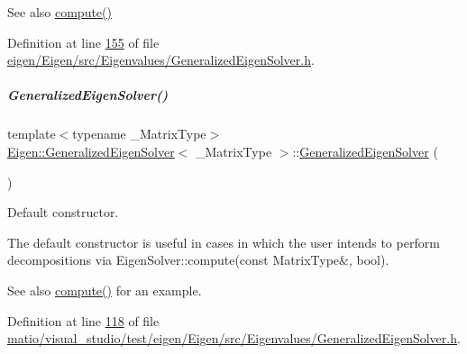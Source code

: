 \begin{DoxySeeAlso}{See also}
\hyperlink{group___eigenvalues___module_a275910b47dfe5f40211dcb59cfd68f3c}{compute()} 
\end{DoxySeeAlso}


Definition at line \hyperlink{eigen_2_eigen_2src_2_eigenvalues_2_generalized_eigen_solver_8h_source_l00155}{155} of file \hyperlink{eigen_2_eigen_2src_2_eigenvalues_2_generalized_eigen_solver_8h_source}{eigen/\+Eigen/src/\+Eigenvalues/\+Generalized\+Eigen\+Solver.\+h}.

\mbox{\label{group___eigenvalues___module_ae745f39da43f9df192cc2875d82b4cf1}} 
\subparagraph{\texorpdfstring{Generalized\+Eigen\+Solver()}{GeneralizedEigenSolver()}\hspace{0.1cm}{\footnotesize\ttfamily [4/6]}}
{\footnotesize\ttfamily template$<$typename \+\_\+\+Matrix\+Type$>$ \\
\hyperlink{group___eigenvalues___module_class_eigen_1_1_generalized_eigen_solver}{Eigen\+::\+Generalized\+Eigen\+Solver}$<$ \+\_\+\+Matrix\+Type $>$\+::\hyperlink{group___eigenvalues___module_class_eigen_1_1_generalized_eigen_solver}{Generalized\+Eigen\+Solver} (\begin{DoxyParamCaption}{ }\end{DoxyParamCaption})\hspace{0.3cm}{\ttfamily [inline]}}



Default constructor. 

The default constructor is useful in cases in which the user intends to perform decompositions via Eigen\+Solver\+::compute(const Matrix\+Type\&, bool).

\begin{DoxySeeAlso}{See also}
\hyperlink{group___eigenvalues___module_a275910b47dfe5f40211dcb59cfd68f3c}{compute()} for an example. 
\end{DoxySeeAlso}


Definition at line \hyperlink{matio_2visual__studio_2test_2eigen_2_eigen_2src_2_eigenvalues_2_generalized_eigen_solver_8h_source_l00118}{118} of file \hyperlink{matio_2visual__studio_2test_2eigen_2_eigen_2src_2_eigenvalues_2_generalized_eigen_solver_8h_source}{matio/visual\+\_\+studio/test/eigen/\+Eigen/src/\+Eigenvalues/\+Generalized\+Eigen\+Solver.\+h}.

